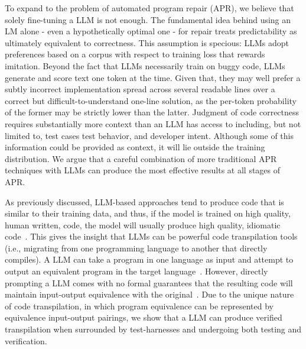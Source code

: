 \documentclass[12pt,openany,oneside,table]{cmuthesis}
\begin{document}

To expand to the problem of automated program repair (APR), we believe that solely fine-tuning a LLM is not enough. The fundamental idea behind using an LM alone - even a hypothetically optimal one - for repair treats predictability as ultimately equivalent to correctness.
This assumption is specious: LLMs adopt preferences based on a corpus
with respect to training loss that rewards imitation. Beyond the fact that LLMs
necessarily train on buggy code, LLMs generate and score text one token at the
time. Given that, they may well prefer a subtly incorrect implementation spread
across several readable lines over a correct but difficult-to-understand one-line
solution, as the per-token probability of the former may be strictly lower than the
latter. Judgment of code correctness requires substantially more context than an
LLM has access to including, but not limited to, test cases test behavior, and
developer intent. Although some of this information could be provided as context,
it will lie outside the training distribution. We argue that a careful combination of more traditional APR techniques with LLMs can produce the most effective results at all stages of APR.

As previously discussed, LLM-based approaches tend to produce code that is similar to their training data, and thus, if the model is trained on high quality, human written, code, the model will usually produce high quality, idiomatic code~\cite{yang2024revisiting}. This gives the insight that LLMs can be powerful code transpilation tools (i.e., migrating from one programming language to another that directly compiles). A LLM can take a program in one language as input and attempt to output an equivalent program in the target
language~\cite{roziere2020unsupervised}. However, directly prompting a LLM comes with no formal guarantees that the resulting code will maintain input-output equivalence with the original~\cite{consistency, xu2024hallucination, pan2024lost}. Due to the unique nature of code transpilation, in which program equivalence can be represented by equivalence input-output pairings, we show that a LLM can produce verified transpilation when surrounded by test-harnesses and undergoing both testing and verification.
\end{document}
